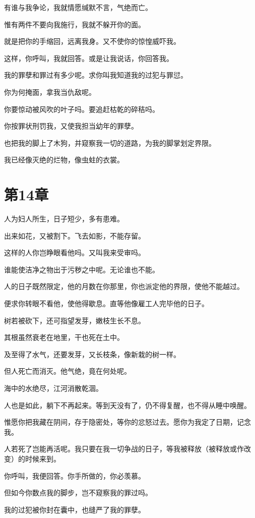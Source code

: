 \documentclass[12pt,oneside]{book}
\begin{document}
有谁与我争论，我就情愿缄默不言，气绝而亡。

惟有两件不要向我施行，我就不躲开你的面。

就是把你的手缩回，远离我身。又不使你的惊惶威吓我。

这样，你呼叫，我就回答。或是让我说话，你回答我。

我的罪孽和罪过有多少呢。求你叫我知道我的过犯与罪愆。

你为何掩面，拿我当仇敌呢。

你要惊动被风吹的叶子吗。要追赶枯乾的碎秸吗。

你按罪状刑罚我，又使我担当幼年的罪孽。

也把我的脚上了木狗，并窥察我一切的道路，为我的脚掌划定界限。

我已经像灭绝的烂物，像虫蛀的衣裳。



\chapter{第14章}
人为妇人所生，日子短少，多有患难。

出来如花，又被割下。飞去如影，不能存留。

这样的人你岂睁眼看他吗。又叫我来受审吗。

谁能使洁净之物出于污秽之中呢。无论谁也不能。

人的日子既然限定，他的月数在你那里，你也派定他的界限，使他不能越过。

便求你转眼不看他，使他得歇息。直等他像雇工人完毕他的日子。

树若被砍下，还可指望发芽，嫩枝生长不息。

其根虽然衰老在地里，干也死在土中。

及至得了水气，还要发芽，又长枝条，像新栽的树一样。

但人死亡而消灭。他气绝，竟在何处呢。

海中的水绝尽，江河消散乾涸。

人也是如此，躺下不再起来。等到天没有了，仍不得复醒，也不得从睡中唤醒。

惟愿你把我藏在阴间，存于隐密处，等你的忿怒过去。愿你为我定了日期，记念我。

人若死了岂能再活呢。我只要在我一切争战的日子，等我被释放（被释放或作改变）的时候来到。

你呼叫，我便回答。你手所做的，你必羡慕。

但如今你数点我的脚步，岂不窥察我的罪过吗。

我的过犯被你封在囊中，也缝严了我的罪孽。
\end{document}

